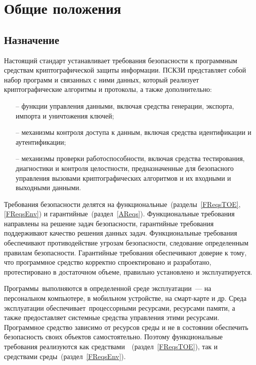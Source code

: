 \providecommand{\CryptoDisk}{<<{Криптодиск}>>\xspace}

\chapter{Общие положения}\label{Common}

\section{Назначение}

Настоящий стандарт устанавливает требования безопасности к программным 
средствам криптографической защиты информации.
ПСКЗИ представляет собой набор программ и связанных с ними данных,
который реализует криптографические алгоритмы и протоколы,
а также дополнительно:
\begin{itemize}
\item[--]
функции управления данными,
включая средства генерации, экспорта, импорта и уничтожения
ключей;

\item[--]
механизмы контроля доступа к данным,
включая средства идентификации и аутентификации;

\item[--]
механизмы проверки работоспособности,
включая средства тестирования, диагностики и 
контроля целостности,
%
предназначенные для безопасного управления вызовами
криптографических алгоритмов и их входными и выходными данными.
\end{itemize}

Требования безопасности делятся на 
функциональные~(разделы~\ref{FReqsTOE}, \ref{FReqsEnv}) 
и гарантийные~(раздел~\ref{AReqs}).
Функциональные требования направлены на решение задач безопасности,
гарантийные требования поддерживают качество решения данных задач.
%
Функциональные требования обеспечивают противодействие угрозам безопасности, 
следование определенным правилам безопасности.
%
Гарантийные требования обеспечивают доверие к тому, 
что программное средство корректно спроектировано и разработано, 
протестировано в достаточном объеме, 
правильно установлено и эксплуатируется.

Программы~\TOE выполняются в определенной среде эксплуатации~---
на персональном компьютере, в мобильном устройстве, на смарт-карте и др.
Среда эксплуатации обеспечивает~\TOE процессорными ресурсами, 
ресурсами памяти, а также предоставляет системные средства 
управления этими ресурсами.
%
Программное средство зависимо от ресурсов среды 
и не в состоянии обеспечить безопасность своих объектов самостоятельно.
Поэтому функциональные требования реализуются
как средствами~\TOE~(раздел~\ref{FReqsTOE}),
так и средствами среды~(раздел~\ref{FReqsEnv}).

